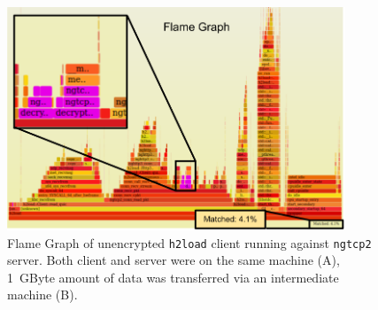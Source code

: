 \documentclass[12pt,a4paper]{report}
\begin{document}
    \begin{figure}[htbp]
    \centering
    \includegraphics[width=0.9\textwidth]{figs/zoomed_unencrypted_flame_graph_1GByte_h2load.png}
    \caption[Flame Graph of unencrypted \texttt{h2load} client running against \texttt{ngtcp2} server]{Flame Graph of unencrypted \texttt{h2load} client running against \texttt{ngtcp2} server.
    Both client and server were on the same machine (A), 1~GByte amount of data was transferred via an intermediate machine (B).}  
    \label{fig:perf_results_of_unencrypted_h2load}
    \end{figure}
    
    
\end{document}

